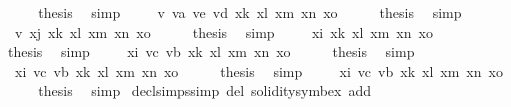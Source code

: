 \begin{isabellebody}
\ \ \isamarkupfalse%
\ \isamarkupfalse%
\ {\isacharquery}{\kern0pt}thesis\ \isamarkupfalse%
\ simp\isanewline
{}\isamarkupfalse%
\isanewline
\ \ \isamarkupfalse%
\ {\isacharparenleft}{\kern0pt}{}{}\ v\ va\ ve\ vd\ xk\ xl\ xm\ xn\ xo{\isacharparenright}{\kern0pt}\isanewline
\ \ \isamarkupfalse%
\ \isamarkupfalse%
\ {\isacharquery}{\kern0pt}thesis\ \isamarkupfalse%
\ simp\isanewline
{}\isamarkupfalse%
\isanewline
\ \ \isamarkupfalse%
\ {\isacharparenleft}{\kern0pt}{}{}\ v\ xj\ xk\ xl\ xm\ xn\ xo{\isacharparenright}{\kern0pt}\isanewline
\ \ \isamarkupfalse%
\ \isamarkupfalse%
\ {\isacharquery}{\kern0pt}thesis\ \isamarkupfalse%
\ simp\isanewline
{}\isamarkupfalse%
\isanewline
\ \ \isamarkupfalse%
\ {\isacharparenleft}{\kern0pt}{}{}\ xi\ xk\ xl\ xm\ xn\ xo{\isacharparenright}{\kern0pt}\isanewline
\ \ \isamarkupfalse%
\ \isamarkupfalse%
\ {\isacharquery}{\kern0pt}thesis\ \isamarkupfalse%
\ simp\isanewline
{}\isamarkupfalse%
\isanewline
\ \ \isamarkupfalse%
\ {\isacharparenleft}{\kern0pt}{}{}\ xi\ vc\ vb\ xk\ xl\ xm\ xn\ xo{\isacharparenright}{\kern0pt}\isanewline
\ \ \isamarkupfalse%
\ \isamarkupfalse%
\ {\isacharquery}{\kern0pt}thesis\ \isamarkupfalse%
\ simp\isanewline
{}\isamarkupfalse%
\isanewline
\ \ \isamarkupfalse%
\ {\isacharparenleft}{\kern0pt}{}{}\ xi\ vc\ vb\ xk\ xl\ xm\ xn\ xo{\isacharparenright}{\kern0pt}\isanewline
\ \ \isamarkupfalse%
\ \isamarkupfalse%
\ {\isacharquery}{\kern0pt}thesis\ \isamarkupfalse%
\ simp\isanewline
{}\isamarkupfalse%
\isanewline
\ \ \isamarkupfalse%
\ {\isacharparenleft}{\kern0pt}{}{}\ xi\ vc\ vb\ xk\ xl\ xm\ xn\ xo{\isacharparenright}{\kern0pt}\isanewline
\ \ \isamarkupfalse%
\ \isamarkupfalse%
\ {\isacharquery}{\kern0pt}thesis\ \isamarkupfalse%
\ simp\isanewline
{}\isamarkupfalse%
%
\endisatagproof
{\isafoldproof}%
%
\isadelimproof
\isanewline
%
\endisadelimproof
\isanewline
{}\isamarkupfalse%
\ decl{\isachardot}{\kern0pt}simps{\isacharbrackleft}{\kern0pt}simp\ del{\isacharcomma}{\kern0pt}\ solidity{\isacharunderscore}{\kern0pt}symbex\ add{\isacharbrackright}{\kern0pt}\isanewline
%
\isadelimtheory
%
\endisadelimtheory
%
\isatagtheory
{}\isamarkupfalse%
%
\endisatagtheory
{\isafoldtheory}%
%
\isadelimtheory
%
\endisadelimtheory
%
\end{isabellebody}%
